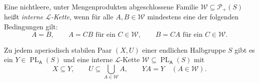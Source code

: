 \begin{definition}
Eine nichtleere, unter Mengenprodukten abgeschlossene Familie
$\mathcal W\subseteq\mathcal P_+(S)$ heißt
\emph{interne $\mathcal L$-Kette}, wenn für alle $A,B\in\mathcal W$
mindestens eine der folgenden Bedingungen gilt:
\[
 A=B,\qquad
 A=CB\text{ für ein }C\in\mathcal W,\qquad
 B=CA\text{ für ein }C\in\mathcal W.
\]
\end{definition}

\begin{theorem}
\label{thm:b37-guide-stable-pairs}
Zu jedem aperiodisch stabilen Paar $(X,U)$ einer endlichen Halbgruppe
$S$ gibt es ein $Y\in\operatorname{PL}_{\mathsf A}(S)$ und eine
interne $\mathcal L$-Kette
$\mathcal W\subseteq\operatorname{PL}_{\mathsf A}(S)$ mit
\[
 X\subseteq Y,\qquad
 U\subseteq\bigcup_{A\in\mathcal W}A,\qquad
 YA=Y\quad(A\in\mathcal W).
\]
\cite[Satz~6.4]{HenckellRhodesSteinberg2010StablePairs}
\end{theorem}
